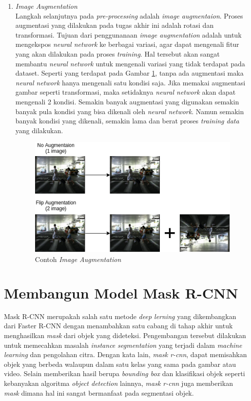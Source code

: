 \begin{enumerate}
	\item \textit{Image Augmentation}\\
	Langkah selanjutnya pada \textit{pre-processing} adalah \textit{image augmentaion}. Proses augmentasi yang dilakukan pada tugas akhir ini adalah rotasi dan transformasi. Tujuan dari penggunanaan \textit{image augmentation} adalah untuk mengekspos \textit{neural network} ke berbagai variasi, agar dapat mengenali fitur yang akan dilakukan pada proses \textit{training}. Hal tersebut akan sangat membantu \textit{neural network} untuk mengenali variasi yang tidak terdapat pada dataset. Seperti yang terdapat pada Gambar \ref{fig:image-augmentation}, tanpa ada augmentasi maka \textit{neural network} hanya mengenali satu kondisi saja. Jika memakai augmentasi gambar seperti transformasi, maka setidaknya \textit{neural network} akan dapat mengenali 2 kondisi. Semakin banyak augmentasi yang digunakan semakin banyak pula kondisi yang bisa dikenali oleh \textit{neural network}. Namun semakin banyak kondisi yang dikenali, semakin lama dan berat proses \textit{training data} yang dilakukan. 
	
	\begin{figure}[ht]
		\centering
		\includegraphics[scale=0.5]{gambar/image-augmentation.png}
		\caption{Contoh \textit{Image Augmentation}}
		\label{fig:image-augmentation}
	\end{figure}
	  
\end{enumerate}

\section{Membangun Model Mask R-CNN
\label{sec:membangunmodelmaskrcnn}}

Mask R-CNN merupakah salah satu metode \textit{deep lerning} yang dikembangkan dari Faster R-CNN dengan menambahkan satu cabang di tahap akhir untuk menghasilkan \textit{mask} dari objek yang dideteksi. Pengembangan tersebut dilakukan untuk memecahkan masalah \textit{instance segmentation} yang terjadi dalam \textit{machine learning} dan pengolahan citra. Dengan kata lain, \textit{mask r-cnn}, dapat memisahkan objek yang berbeda walaupun dalam satu kelas yang sama pada gambar atau video. Selain memberikan hasil berupa \textit{bounding box} dan klasifikasi objek seperti kebanyakan algoritma \textit{object detection} lainnya, \textit{mask r-cnn} juga memberikan \textit{mask} dimana hal ini sangat bermanfaat pada segmentasi objek.

